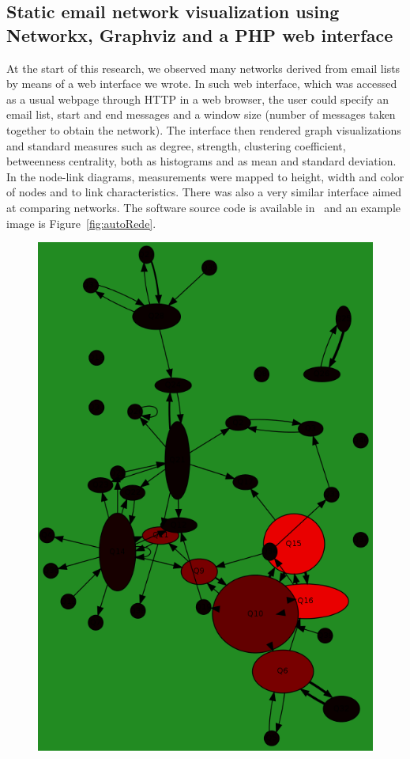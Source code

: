 \begin{apendicesenv}
	\subsection{Static email network visualization using Networkx, Graphviz and a PHP web interface}\label{sec:autoRede}
	At the start of this research, we observed many networks derived from email lists
	by means of a web interface we wrote.
	In such web interface, which was accessed as a usual webpage through HTTP in a web browser, 
	the user could specify an email list, start and end messages and a window size (number of messages taken together to obtain the network).
	The interface then rendered graph visualizations and standard measures such as degree, strength, clustering coefficient, betweenness centrality, both as histograms and as mean and standard deviation.
	In the node-link diagrams, measurements were mapped to height, width and color of nodes and to link characteristics.
	There was also a very similar interface aimed at comparing networks.
	The software source code is available in~\cite{autoRede} and an example image is Figure~\ref{fig:autoRede}.
\begin{figure}[h!]
\begin{center}
\includegraphics[scale=.25]{figs/autoRede_}

\end{center}
\end{figure}
\end{apendicesenv}
